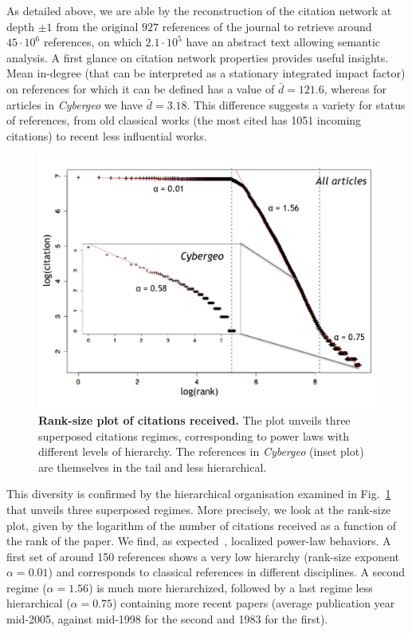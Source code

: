 
As detailed above, we are able by the reconstruction of the citation network at depth $\pm 1$ from the original $927$ references of the journal to retrieve around $45\cdot 10^6$ references, on which $2.1\cdot 10^5$ have an abstract text allowing semantic analysis. A first glance on citation network properties provides useful insights. Mean in-degree (that can be interpreted as a stationary integrated impact factor) on references for which it can be defined has a value of $\bar{d}=121.6$, whereas for articles in \textit{Cybergeo} we have $\bar{d}=3.18$. This difference suggests a variety for status of references, from old classical works (the most cited has 1051 incoming citations) to recent less influential works.


\begin{figure}
\centering
\includegraphics[width=\textwidth]{figures/Fig3.jpg}
\caption{\textbf{Rank-size plot of citations received.} The plot unveils three superposed citations regimes, corresponding to power laws with different levels of hierarchy. The references in \textit{Cybergeo} (inset plot) are themselves in the tail and less hierarchical.}
\label{fig:ranksize}
\end{figure}


This diversity is confirmed by the hierarchical organisation examined in Fig.~\ref{fig:ranksize} that unveils three superposed regimes. More precisely, we look at the rank-size plot, given by the logarithm of the number of citations received as a function of the rank of the paper. We find, as expected~\citep{redner1998popular}, localized power-law behaviors. A first set of around 150 references shows a very low hierarchy (rank-size exponent $\alpha = 0.01$) and corresponds to classical references in different disciplines. A second regime ($\alpha = 1.56$) is much more hierarchized, followed by a last regime less hierarchical ($\alpha = 0.75$) containing more recent papers (average publication year mid-2005, against mid-1998 for the second and 1983 for the first).



